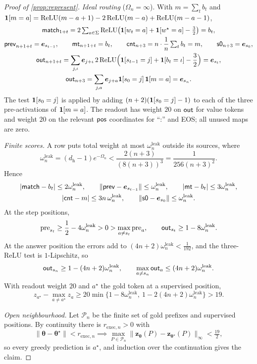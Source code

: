 \begin{proof}[Proof of \cref{prop:represent}]
\emph{Ideal routing} ($\Omega_n=\infty$). With $m=\sum_tb_t$ and $\mathbf 1[m=a]=\operatorname{ReLU}(m-a+1)-2\operatorname{ReLU}(m-a)+\operatorname{ReLU}(m-a-1)$,
\begin{gather*}
 \reg{match}_{1+t}=2\textstyle\sum_{a\in\Sigma}\relu\bigl(\one[w_t=a]+\one[w^\star=a]-\frac{3}{2}\bigr)=b_t,\\
 \reg{prev}_{n+1+t}=\bm e_{s_{t-1}},\qquad \reg{mt}_{n+1+t}=b_t,\qquad
 \reg{cnt}_{n+3}=n\cdot\tfrac{1}{n}\textstyle\sum_tb_t=m,\qquad \reg{s0}_{n+3}=\bm e_{s_0},\\
 \reg{out}_{n+1+t}=\sum_{j,\iota}\bm e_{j+\iota}\,2\relu\Bigl(\one[s_{t-1}=j]+\one[b_t=\iota]-\frac{3}{2}\Bigr)=\bm e_{s_t},\\
 \reg{out}_{n+3}=\sum_{j,a}\bm e_{j+a}\one[s_0=j]\,\one[m=a]=\bm e_{s_n}.
\end{gather*}
The test $\mathbf 1[s_0=j]$ is applied by adding $(n+2)(\mathbf 1[s_0=j]-1)$ to each of the three pre-activations of $\mathbf 1[m=a]$. The readout has weight $20$
on $\mathsf{out}$ for value tokens and weight $20$ on the relevant $\mathsf{pos}$ coordinates for ``:'' and EOS; all unused maps are zero.

\emph{Finite scores.} A row puts total weight at most $\omega^{\mathrm{leak}}_n$ outside its sources, where
\[
 \omega^{\mathrm{leak}}_n=(d_{\mathrm h}-1)e^{-\Omega_n}<\frac{2(n+3)}{(8(n+3))^3}=\frac{1}{256(n+3)^2}.
\]
Hence
\begin{gather*}
 |\mathsf{match}-b_t|\le2\omega^{\mathrm{leak}}_n,\qquad \|\mathsf{prev}-\bm e_{s_{t-1}}\|\le\omega^{\mathrm{leak}}_n,\qquad |\mathsf{mt}-b_t|\le3\omega^{\mathrm{leak}}_n,\\
 |\mathsf{cnt}-m|\le3n\,\omega^{\mathrm{leak}}_n,\qquad \|\mathsf{s0}-\bm e_{s_0}\|\le\omega^{\mathrm{leak}}_n .
\end{gather*}
At the step positions,
\[
 \mathrm{pre}_{s_t}\ge\tfrac{1}{2}-4\omega^{\mathrm{leak}}_n>0>\max_{a\ne s_t}\mathrm{pre}_a,\qquad \reg{out}_{s_t}\ge1-8\omega^{\mathrm{leak}}_n .
\]
At the answer position the errors add to $(4n+2)\omega^{\mathrm{leak}}_n<\frac{1}{192}$, and the three-ReLU test is $1$-Lipschitz, so
\[
 \mathsf{out}_{s_n}\ge1-(4n+2)\omega^{\mathrm{leak}}_n,\qquad \max_{a\ne s_n}\mathsf{out}_a\le(4n+2)\omega^{\mathrm{leak}}_n .
\]
With readout weight $20$ and $a^\star$ the gold token at a supervised position,
\[
 z_{a^\star}-\max_{a\ne a^\star}z_a\ge20\min\bigl\{1-8\omega^{\mathrm{leak}}_n,\ 1-2(4n+2)\omega^{\mathrm{leak}}_n\bigr\}>19 .
\]

\emph{Open neighbourhood.} Let $\mathcal P_n$ be the finite set of gold prefixes and supervised positions. By continuity there is
$r_{\mathrm{exec},n}>0$ with
\[
 \|\bm\theta-\bm\theta^\star\|<r_{\mathrm{exec},n}\implies\max_{P\in\mathcal P_n}\|\bm z_{\bm\theta}(P)-\bm z_{\bm\theta^\star}(P)\|_\infty<\tfrac{19}{2},
\]
so every greedy prediction is $a^\star$, and induction over the continuation gives the claim.
\end{proof}


